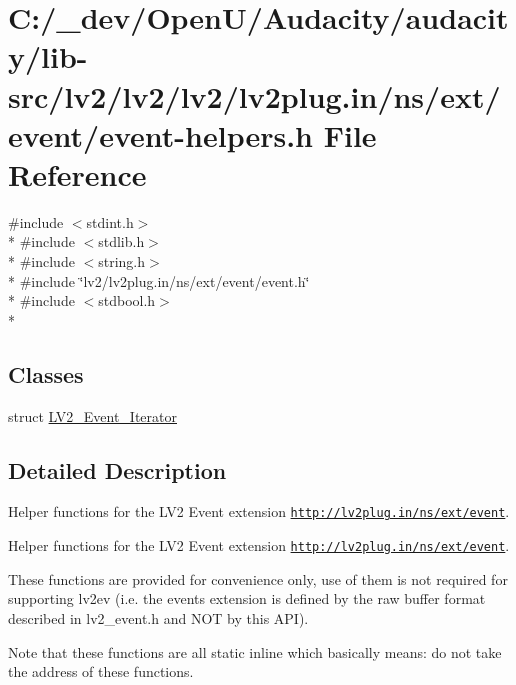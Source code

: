 \hypertarget{event-helpers_8h}{}\section{C\+:/\+\_\+dev/\+Open\+U/\+Audacity/audacity/lib-\/src/lv2/lv2/lv2/lv2plug.in/ns/ext/event/event-\/helpers.h File Reference}
\label{event-helpers_8h}
{\ttfamily \#include $<$stdint.\+h$>$}\\*
{\ttfamily \#include $<$stdlib.\+h$>$}\\*
{\ttfamily \#include $<$string.\+h$>$}\\*
{\ttfamily \#include \char`\"{}lv2/lv2plug.\+in/ns/ext/event/event.\+h\char`\"{}}\\*
{\ttfamily \#include $<$stdbool.\+h$>$}\\*
\subsection*{Classes}
\begin{DoxyCompactItemize}
\item 
struct \hyperlink{struct_l_v2___event___iterator}{L\+V2\+\_\+\+Event\+\_\+\+Iterator}
\end{DoxyCompactItemize}


\subsection{Detailed Description}
Helper functions for the L\+V2 Event extension \href{http://lv2plug.in/ns/ext/event}{\tt http\+://lv2plug.\+in/ns/ext/event}.

Helper functions for the L\+V2 Event extension \href{http://lv2plug.in/ns/ext/event}{\tt http\+://lv2plug.\+in/ns/ext/event}.

These functions are provided for convenience only, use of them is not required for supporting lv2ev (i.\+e. the events extension is defined by the raw buffer format described in lv2\+\_\+event.\+h and N\+OT by this A\+PI).

Note that these functions are all static inline which basically means\+: do not take the address of these functions. 
